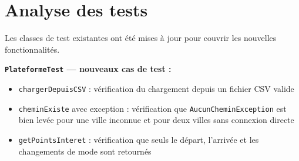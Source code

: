 \documentclass[fontsize=10pt,oneside,parskip=half]{scrreprt}
\newcommand{\ic}[1]{{\setlength{\fboxsep}{2pt}\colorbox{BeigeSerein}{\texttt{#1}}}}
\begin{document}
\section{Analyse des tests}

Les classes de test existantes ont été mises à jour pour couvrir les nouvelles
fonctionnalités.

\noindent\textbf{\ic{PlateformeTest} — nouveaux cas de test :}
\begin{itemize}
  \item \ic{chargerDepuisCSV} : vérification du chargement depuis un fichier CSV valide
  \item \ic{cheminExiste} avec exception : vérification que \ic{AucunCheminException}
        est bien levée pour une ville inconnue et pour deux villes sans connexion directe
  \item \ic{getPointsInteret} : vérification que seuls le départ, l'arrivée et les
        changements de mode sont retournés
\end{itemize}
\end{document}
